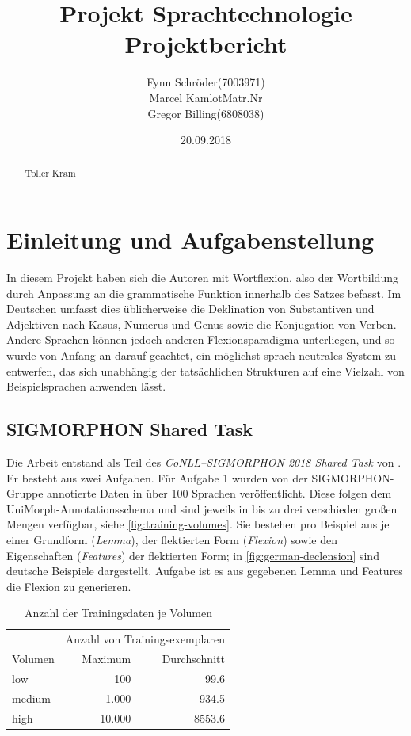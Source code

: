 \documentclass[a4paper]{article}
\title{Projekt Sprachtechnologie\\Projektbericht}
\author{Fynn Schröder\qquad (7003971)\\Marcel Kamlot\qquad Matr.Nr\\Gregor Billing\qquad(6808038)}
\date{20.09.2018}
\begin{document}
\maketitle

\begin{abstract}
Toller Kram
\end{abstract}

\section{Einleitung und Aufgabenstellung}
\label{sec:introduction}
In diesem Projekt haben sich die Autoren mit Wortflexion, also der Wortbildung durch Anpassung an die grammatische Funktion innerhalb des Satzes befasst. Im Deutschen umfasst dies üblicherweise die Deklination von Substantiven und Adjektiven nach Kasus, Numerus und Genus sowie die Konjugation von Verben.
Andere Sprachen können jedoch anderen Flexionsparadigma unterliegen, und so wurde von Anfang an darauf geachtet, ein möglichst sprach-neutrales System zu entwerfen, das sich unabhängig der tatsächlichen Strukturen auf eine Vielzahl von Beispielsprachen anwenden lässt.

\subsection{SIGMORPHON Shared Task}
\label{sec:sub:shared_task}
Die Arbeit entstand als Teil des \textit{CoNLL--SIGMORPHON 2018 Shared Task} von \citet{sigmorphon:st2018}. Er besteht aus zwei Aufgaben.  Für Aufgabe 1 wurden von der SIGMORPHON-Gruppe annotierte Daten in über 100 Sprachen veröffentlicht. Diese folgen dem UniMorph-Annotationsschema \citep{kirov:unimorph2018} und sind jeweils in bis zu drei verschieden großen Mengen  verfügbar, siehe \autoref{fig:training-volumes}. Sie bestehen pro Beispiel aus je einer Grundform (\textit{Lemma}), der flektierten Form (\textit{Flexion}) sowie den Eigenschaften (\textit{Features}) der flektierten Form; in \autoref{fig:german-declension} sind deutsche Beispiele dargestellt. Aufgabe ist es aus gegebenen Lemma und Features die Flexion zu generieren.

\begin{table}[htb]
\centering
\begin{tabular}{lrr}
\toprule
& \multicolumn{2}{c}{Anzahl von Trainingsexemplaren}\\ \cmidrule{2-3}
Volumen & Maximum & Durchschnitt\\
\midrule
low & 100 & 99.6\\
medium & 1.000 & 934.5\\
high & 10.000 & 8553.6\\
\bottomrule
\end{tabular}
\caption{Anzahl der Trainingsdaten je Volumen}
\label{fig:training-volumes}
\end{table}
\end{document}

